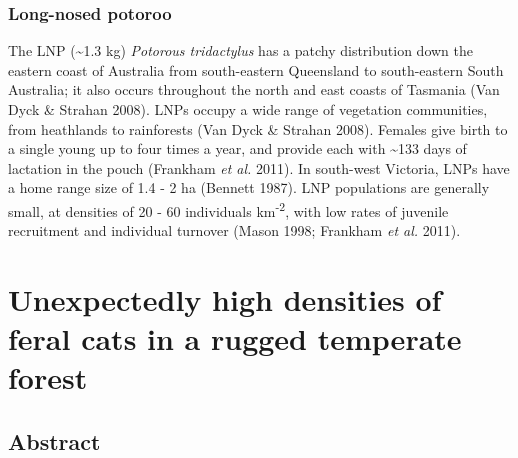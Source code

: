 \documentclass[11pt,a4paper,titlepage,twoside,openright]{style/unimelbthesis}
\begin{document}
\begin{mainmatter}
\hypertarget{long-nosed-potoroo}{%
\subsection{Long-nosed potoroo}\label{long-nosed-potoroo}}

The LNP (\textasciitilde1.3 kg) \emph{Potorous tridactylus} has a patchy distribution down the eastern coast of Australia from south-eastern Queensland to south-eastern South Australia; it also occurs throughout the north and east coasts of Tasmania (Van Dyck \& Strahan 2008). LNPs occupy a wide range of vegetation communities, from heathlands to rainforests (Van Dyck \& Strahan 2008). Females give birth to a single young up to four times a year, and provide each with \textasciitilde133 days of lactation in the pouch (Frankham \emph{et al.} 2011). In south-west Victoria, LNPs have a home range size of 1.4 - 2 ha (Bennett 1987). LNP populations are generally small, at densities of 20 - 60 individuals km\textsuperscript{-2}, with low rates of juvenile recruitment and individual turnover (Mason 1998; Frankham \emph{et al.} 2011).

\hypertarget{otways17}{%
\chapter{Unexpectedly high densities of feral cats in a rugged temperate forest}\label{otways17}}

\hypertarget{abstract}{%
\section*{Abstract}\label{abstract}}


\end{mainmatter}
\end{document}
